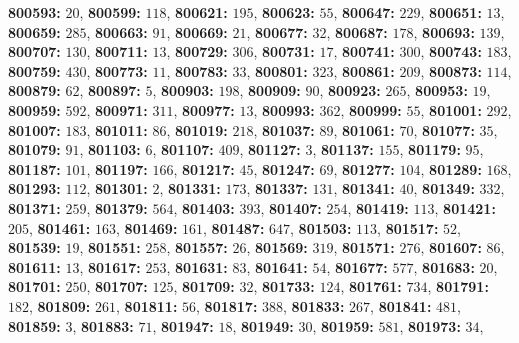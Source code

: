 \textsf{\bfseries 800593:} $20$, \textsf{\bfseries 800599:} $118$, \textsf{\bfseries 800621:} $195$, \textsf{\bfseries 800623:} $55$, \textsf{\bfseries 800647:} $229$, \textsf{\bfseries 800651:} $13$, \textsf{\bfseries 800659:} $285$, \textsf{\bfseries 800663:} $91$, \textsf{\bfseries 800669:} $21$, \textsf{\bfseries 800677:} $32$, \textsf{\bfseries 800687:} $178$, \textsf{\bfseries 800693:} $139$, \textsf{\bfseries 800707:} $130$, \textsf{\bfseries 800711:} $13$, \textsf{\bfseries 800729:} $306$, \textsf{\bfseries 800731:} $17$, \textsf{\bfseries 800741:} $300$, \textsf{\bfseries 800743:} $183$, \textsf{\bfseries 800759:} $430$, \textsf{\bfseries 800773:} $11$, \textsf{\bfseries 800783:} $33$, \textsf{\bfseries 800801:} $323$, \textsf{\bfseries 800861:} $209$, \textsf{\bfseries 800873:} $114$, \textsf{\bfseries 800879:} $62$, \textsf{\bfseries 800897:} $5$, \textsf{\bfseries 800903:} $198$, \textsf{\bfseries 800909:} $90$, \textsf{\bfseries 800923:} $265$, \textsf{\bfseries 800953:} $19$, \textsf{\bfseries 800959:} $592$, \textsf{\bfseries 800971:} $311$, \textsf{\bfseries 800977:} $13$, \textsf{\bfseries 800993:} $362$, \textsf{\bfseries 800999:} $55$, \textsf{\bfseries 801001:} $292$, \textsf{\bfseries 801007:} $183$, \textsf{\bfseries 801011:} $86$, \textsf{\bfseries 801019:} $218$, \textsf{\bfseries 801037:} $89$, \textsf{\bfseries 801061:} $70$, \textsf{\bfseries 801077:} $35$, \textsf{\bfseries 801079:} $91$, \textsf{\bfseries 801103:} $6$, \textsf{\bfseries 801107:} $409$, \textsf{\bfseries 801127:} $3$, \textsf{\bfseries 801137:} $155$, \textsf{\bfseries 801179:} $95$, \textsf{\bfseries 801187:} $101$, \textsf{\bfseries 801197:} $166$, \textsf{\bfseries 801217:} $45$, \textsf{\bfseries 801247:} $69$, \textsf{\bfseries 801277:} $104$, \textsf{\bfseries 801289:} $168$, \textsf{\bfseries 801293:} $112$, \textsf{\bfseries 801301:} $2$, \textsf{\bfseries 801331:} $173$, \textsf{\bfseries 801337:} $131$, \textsf{\bfseries 801341:} $40$, \textsf{\bfseries 801349:} $332$, \textsf{\bfseries 801371:} $259$, \textsf{\bfseries 801379:} $564$, \textsf{\bfseries 801403:} $393$, \textsf{\bfseries 801407:} $254$, \textsf{\bfseries 801419:} $113$, \textsf{\bfseries 801421:} $205$, \textsf{\bfseries 801461:} $163$, \textsf{\bfseries 801469:} $161$, \textsf{\bfseries 801487:} $647$, \textsf{\bfseries 801503:} $113$, \textsf{\bfseries 801517:} $52$, \textsf{\bfseries 801539:} $19$, \textsf{\bfseries 801551:} $258$, \textsf{\bfseries 801557:} $26$, \textsf{\bfseries 801569:} $319$, \textsf{\bfseries 801571:} $276$, \textsf{\bfseries 801607:} $86$, \textsf{\bfseries 801611:} $13$, \textsf{\bfseries 801617:} $253$, \textsf{\bfseries 801631:} $83$, \textsf{\bfseries 801641:} $54$, \textsf{\bfseries 801677:} $577$, \textsf{\bfseries 801683:} $20$, \textsf{\bfseries 801701:} $250$, \textsf{\bfseries 801707:} $125$, \textsf{\bfseries 801709:} $32$, \textsf{\bfseries 801733:} $124$, \textsf{\bfseries 801761:} $734$, \textsf{\bfseries 801791:} $182$, \textsf{\bfseries 801809:} $261$, \textsf{\bfseries 801811:} $56$, \textsf{\bfseries 801817:} $388$, \textsf{\bfseries 801833:} $267$, \textsf{\bfseries 801841:} $481$, \textsf{\bfseries 801859:} $3$, \textsf{\bfseries 801883:} $71$, \textsf{\bfseries 801947:} $18$, \textsf{\bfseries 801949:} $30$, \textsf{\bfseries 801959:} $581$, \textsf{\bfseries 801973:} $34$, 
